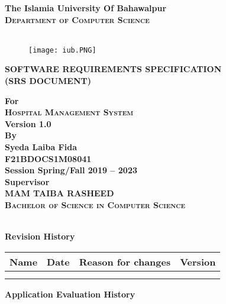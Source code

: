 \documentclass{article}
\begin{document}
\begin{titlepage}
    \centering
    {\bfseries\Large\gothfamily The Islamia University Of Bahawalpur}\\ \hfill \break
    {\Large\bfseries\scshape Department of Computer Science}\\\\
    \begin{figure}[htp]
    \centering
    \texttt{[image: iub.PNG]}
    \label{fig:iub}
\end{figure}
    {\bfseries\Large SOFTWARE REQUIREMENTS SPECIFICATION}\\\hfill \break
    \textbf{(SRS DOCUMENT)}\\\hfill \break
    
    {\bfseries\Large For}\\ \hfill \break
    {\Large\bfseries\scshape Hospital Management System}\\ \hfill \break
    \textbf{Version 1.0}\\ \hfill \break
    {\bfseries\Large By}\\ \hfill \break
    {\bfseries\Large Syeda Laiba Fida}\\ \hfill \break
    {\bfseries\Large F21BDOCS1M08041}\\ \hfill \break
    {\bfseries Session Spring/Fall 2019 – 2023}\\ \hfill \break
    {\bfseries\Large Supervisor}\\ \hfill \break
    {\bfseries\Large MAM TAIBA RASHEED}\\ \hfill \break
    {\Large\bfseries\scshape Bachelor of Science in Computer Science }\\
  
  \end{titlepage}
\newpage
\tableofcontents
\newpage
\\
\textbf{Revision History}\\ \hfill \break
\begin{tabularx}{0.8\textwidth} { 
  | >{\raggedright\arraybackslash}X 
  | >{\centering\arraybackslash}X 
  | >{\raggedleft\arraybackslash}X 
  | >{\raggedleft\arraybackslash}X |}
 \hline
 Name & Date & Reason for changes & Version \\
 \hline
   &   &   &   &  \\
\hline
  &   &   &   &  \\
\hline
\end{tabularx}
\newpage
\textbf{Application Evaluation History}\\ \hfill \break
\end{document}

